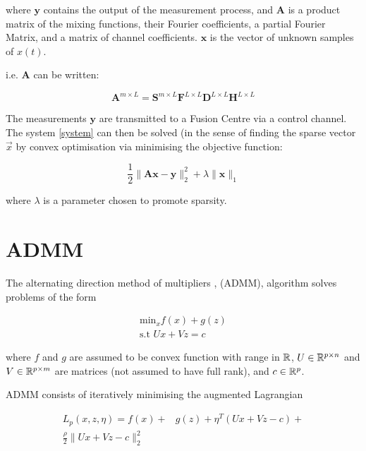 \documentclass[conference]{IEEEtran}
\begin{document}
where \(\textbf{y}\) contains the output of the measurement process, and \(\textbf{A}\) is a product matrix of the mixing functions, their Fourier coefficients, a partial Fourier Matrix, and a matrix of channel coefficients. \(\textbf{x}\) is the vector of unknown samples of \(x\left(t\right)\). 

i.e. \(\textbf{A}\) can be written: 

\begin{equation}
\textbf{A}^{m\times L} = \textbf{S}^{m\times L} \textbf{F}^{L\times L} \textbf{D}^{L \times L} \textbf{H}^{L \times L}
\end{equation}

The measurements \(\textbf{y}\) are transmitted to a Fusion Centre via a control channel. The system  \ref{system} can then be solved (in the sense of finding the sparse vector \(\vec{x}\) by convex optimisation via minimising the objective function:

\begin{equation}
\frac{1}{2}\|\textbf{Ax}-\textbf{y}\|_2^2 + \lambda \|\textbf{x}\|_1
\end{equation}

where \(\lambda\) is a parameter chosen to promote sparsity. 

\section{ADMM }\label{sec:admm}
The alternating direction method of multipliers \cite{Boyd2010a}, (ADMM), algorithm solves problems of the form

\begin{align}
\text{min}_{x} f\left( x \right) + g\left(z\right)
\\
\text{s.t } Ux +Vz = c
\label{admm}
\end{align}

where \(f\) and \(g\) are assumed to be convex function with range in \({\mathbb{R}}\), \(U \in {\mathbb{R}}^{p \times n}\) and \(V\in {\mathbb{R}}^{p \times m}\) are matrices (not assumed to have full rank), and \(c \in {\mathbb{R}}^p\).

ADMM consists of iteratively minimising the augmented Lagrangian 

\begin{align*}
L_p\left(x, z, \eta\right) = f\left( x\right) +& g\left(z\right)+\eta^T\left(Ux+Vz-c\right) + \\ \frac{\rho}{2}\|Ux+Vz-c\|_2^2
\label{admm_form}
\end{align*}
\end{document}
